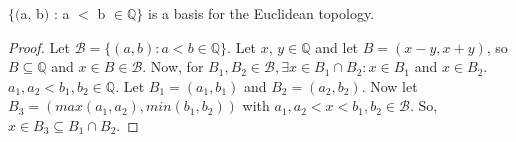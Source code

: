 \documentclass{article}
\begin{document}
	\begin{theorem}
	$\lbrace($a, b$)$ : a $<$ b $\in \mathbb{Q}\rbrace$ is a basis for the Euclidean topology.
	\end{theorem}
	\begin{proof}
	Let $\mathcal{B} = \lbrace (a, b) : a<b \in \mathbb{Q}\rbrace$. Let $x$, $y \in \mathbb{Q}$ and let $B = (x-y, x+y)$, so $B \subseteq \mathbb{Q}$ and $x \in B \in \mathcal{B}$. Now, for $B_1, B_2 \in \mathcal{B}, \exists x \in B_1 \cap B_2 : x \in B_1$ and $x \in B_2$. $a_1, a_2 < b_1, b_2 \in \mathbb{Q}.$ Let $B_1 = (a_1, b_1)$ and $B_2 = (a_2, b_2)$. Now let $B_3 = (max(a_1,a_2), min(b_1,b_2))$ with $a_1,a_2<x<b_1,b_2 \in \mathcal{B}$. So, $x \in B_3 \subseteq B_1 \cap B_2$.
	\end{proof}
\end{document}
